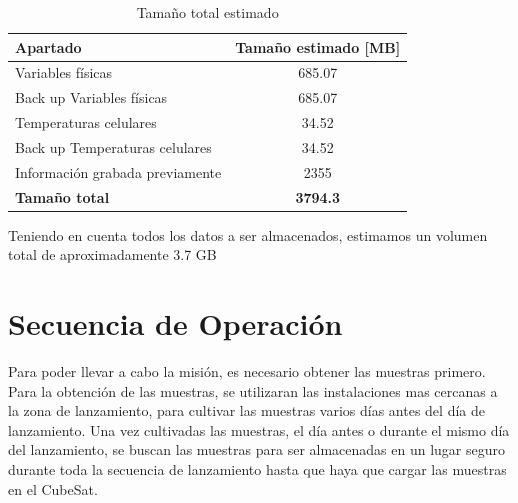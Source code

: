       \begin{table}[H]
      \centering
      \begin{tabular}{|l|c|}
      \hline
      \textbf{Apartado} & \textbf{Tamaño estimado [MB]} \\
      \hline
      Variables físicas              & 685.07 \\
      Back up Variables físicas      & 685.07 \\
      Temperaturas celulares         & 34.52  \\
      Back up Temperaturas celulares & 34.52  \\
      Información grabada previamente & 2355 \\
      \hline
      \textbf{Tamaño total}          & \textbf{3794.3} \\
      \hline
      \end{tabular}
      \caption{Tamaño total estimado}
      \label{tab:tamano_total_estimado}
      \end{table}

      Teniendo en cuenta todos los datos a ser almacenados, estimamos un volumen total de
      aproximadamente 3.7 GB

\section{Secuencia de Operación}
  Para poder llevar a cabo la misión, es necesario obtener las muestras primero. Para la obtención de las muestras, se
  utilizaran las instalaciones mas cercanas a la zona de lanzamiento, para cultivar las muestras varios días antes del
  día de lanzamiento. Una vez cultivadas las muestras, el día antes o durante el mismo día del lanzamiento, se buscan
  las muestras para ser almacenadas en un lugar seguro durante toda la secuencia de lanzamiento hasta que haya que
  cargar las muestras en el CubeSat.

